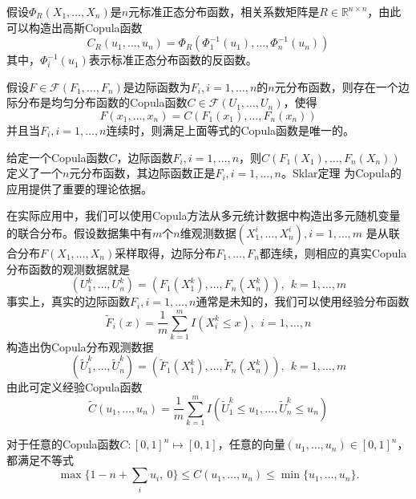 \begin{definition}[高斯Copula函数]
假设$\Phi_R(X_1,\ldots,X_n)$是$n$元标准正态分布函数，相关系数矩阵是$R\in\mathbb R^{n\times n}$，由此可以构造出高斯Copula函数
\begin{equation}
    C_R(u_1,\ldots,u_n) = \Phi_R(\Phi_1^{-1}(u_1),\ldots,\Phi_n^{-1}(u_n))
\end{equation}
其中，$\Phi_i^{-1}(u_1)$表示标准正态分布函数的反函数。
\end{definition}

\begin{theorem}[Sklar定理]
假设$F\in \mathcal{F}(F_1,\ldots,F_n)$是边际函数为$F_i,i=1,\ldots,n$的$n$元分布函数，则存在一个边际分布是均匀分布函数的Copula函数$C\in \mathcal{F}(U_1,\ldots,U_n)$，使得
\begin{equation}
    F(x_1,\ldots,x_n) = C(F_1(x_1),\ldots,F_n(x_n))
\end{equation}
并且当$F_i,i=1,\ldots,n$连续时，则满足上面等式的Copula函数是唯一的。
\end{theorem}
给定一个Copula函数$C$，边际函数$F_i,i=1,\ldots,n$，则$C(F_1(X_1),\ldots,F_n(X_n))$定义了一个$n$元分布函数，其边际函数正是$F_i,i=1,\ldots,n$。Sklar定理
\cite{sklar1959fonctions}为Copula的应用提供了重要的理论依据。

在实际应用中，我们可以使用Copula方法从多元统计数据中构造出多元随机变量的联合分布。假设数据集中有$m$个$n$维观测数据$(X_1^i, \ldots, X_n^i),i=1,\ldots,m$ 是从联合分布$F(X_1,\ldots,X_n)$采样取得，边际分布$F_1,\ldots,F_n$都连续，则相应的真实Copula分布函数的观测数据就是
\begin{equation}
    (U_1^k,\ldots, U_n^k) = (F_1(X_1^k),\ldots,F_n(X_n^k)),~~k=1,\ldots,m
\end{equation}
事实上，真实的边际函数$F_i,i=1,\ldots,n$通常是未知的，我们可以使用经验分布函数
\begin{equation}
    \tilde F_i (x) = \frac{1}{m} \sum\limits_{k=1}^m I(X_i^k \le x), ~~i=1,\ldots,n
\end{equation}
构造出伪Copula分布观测数据
\begin{equation}
    (\tilde U_1^k,\ldots, \tilde U_n^k) = (\tilde F_1(X_1^k),\ldots,\tilde F_n(X_n^k)),~~k=1,\ldots,m
\end{equation}
由此可定义经验Copula函数
\begin{equation}
    \tilde C(u_1,\ldots,u_n) = \frac{1}{m} \sum\limits_{k=1}^m I(\tilde U_1^k \le u_1,\ldots, \tilde U_n^k \le u_n)
\end{equation}

\begin{theorem}
对于任意的Copula函数$C:[0,1]^n\mapsto [0,1]$，任意的向量$(u_1,\ldots,u_n)\in [0,1]^n$，都满足不等式
\begin{equation}
    \max\big\{1-n+\sum\limits_i u_i,~0\big\} \le C(u_1,\ldots,u_n) \le \min\big\{u_1,\ldots,u_n\big\}.
\end{equation}
\end{theorem}
